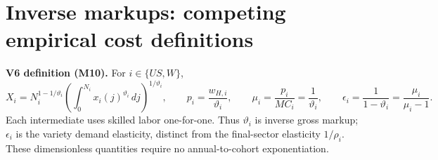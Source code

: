 \clearpage
\section{Inverse markups: competing empirical cost definitions}
\textbf{V6 definition (M10).} For $i\in\{US,W\}$,
\[
X_i=N_i^{1-1/\vartheta_i}\left(\int_0^{N_i}x_i(j)^{\vartheta_i}\,dj\right)^{1/\vartheta_i},
\qquad p_i=\frac{w_{H,i}}{\vartheta_i},\qquad
\mu_i=\frac{p_i}{MC_i}=\frac1{\vartheta_i},\qquad
\epsilon_i=\frac1{1-\vartheta_i}=\frac{\mu_i}{\mu_i-1}.
\]
Each intermediate uses skilled labor one-for-one. Thus $\vartheta_i$ is inverse gross markup; $\epsilon_i$ is the variety demand elasticity, distinct from the final-sector elasticity $1/\rho_i$. These dimensionless quantities require no annual-to-cohort exponentiation.

